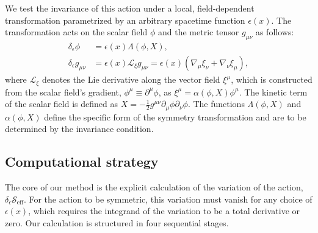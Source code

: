 \documentclass[twocolumn]{aastex631}
\begin{document}
We test the invariance of this action under a local, field-dependent transformation parametrized by an arbitrary spacetime function $\epsilon(x)$. The transformation acts on the scalar field $\phi$ and the metric tensor $g_{\mu\nu}$ as follows:
\begin{align}
    \delta_\epsilon \phi &= \epsilon(x) \Lambda(\phi, X), \\
    \delta_\epsilon g_{\mu\nu} &= \epsilon(x) \mathcal{L}_{\xi} g_{\mu\nu} = \epsilon(x) (\nabla_\mu \xi_\nu + \nabla_\nu \xi_\mu),
\end{align}
where $\mathcal{L}_{\xi}$ denotes the Lie derivative along the vector field $\xi^\mu$, which is constructed from the scalar field's gradient, $\phi^\mu \equiv \partial^\mu\phi$, as $\xi^\mu = \alpha(\phi, X)\phi^\mu$. The kinetic term of the scalar field is defined as $X = -\frac{1}{2}g^{\mu\nu}\partial_\mu\phi\partial_\nu\phi$. The functions $\Lambda(\phi, X)$ and $\alpha(\phi, X)$ define the specific form of the symmetry transformation and are to be determined by the invariance condition.

\subsection{Computational strategy}

The core of our method is the explicit calculation of the variation of the action, $\delta_\epsilon \mathcal{S}_{\text{eff}}$. For the action to be symmetric, this variation must vanish for any choice of $\epsilon(x)$, which requires the integrand of the variation to be a total derivative or zero. Our calculation is structured in four sequential stages.
\end{document}
